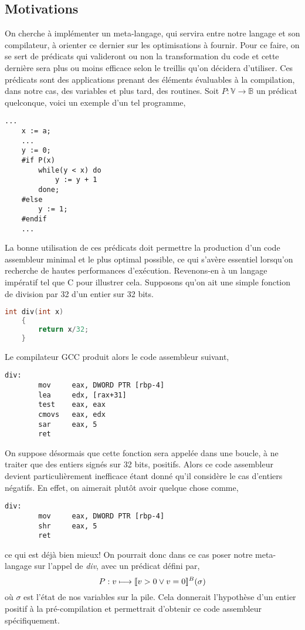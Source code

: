 \documentclass[a4paper, 10pt]{article}
\begin{document}
\subsection{Motivations}
On cherche à implémenter un meta-langage, qui servira entre notre langage et son compilateur, à orienter
ce dernier sur les optimisations à fournir. Pour ce faire, on se sert de prédicats qui valideront ou non la
transformation du code et cette dernière sera plus ou moins efficace selon le treillis qu'on décidera d'utiliser. 
Ces prédicats sont des applications prenant des éléments évaluables à la compilation, 
dans notre cas, des variables et plus tard, des routines.
Soit $P : \mathbb{V} \longrightarrow \mathbb{B}$ un prédicat quelconque, voici un exemple d'un tel programme,
\begin{lstlisting}[tabsize=2]
	...
	x := a;
	...
	y := 0;
	#if P(x)
		while(y < x) do
			y := y + 1
		done;
	#else
		y := 1;
	#endif
	...
\end{lstlisting}
La bonne utilisation de ces prédicats doit permettre la production d'un code assembleur minimal et le plus
optimal possible, ce qui s'avère essentiel lorsqu'on recherche de hautes performances d'exécution.
Revenons-en à un langage impératif tel que C pour illustrer cela. Supposons qu'on ait une simple fonction de division 
par 32 d'un entier sur 32 bits.
\begin{lstlisting}[tabsize=2, language=c]
	int div(int x)
	{
		return x/32;
	}
\end{lstlisting}
Le compilateur GCC produit alors le code assembleur suivant,
\begin{lstlisting}[tabsize=2]
	div:
		mov     eax, DWORD PTR [rbp-4]
		lea     edx, [rax+31]
		test    eax, eax
		cmovs   eax, edx
		sar     eax, 5
		ret
\end{lstlisting}
On suppose désormais que cette fonction sera appelée dans une boucle, à ne traiter que des entiers signés sur 32 bits, positifs.
Alors ce code assembleur devient particulièrement inefficace étant donné qu'il considère le cas d'entiers
négatifs. En effet, on aimerait plutôt avoir quelque chose comme,
\begin{lstlisting}[tabsize=2]
	div:
		mov     eax, DWORD PTR [rbp-4]
		shr     eax, 5
		ret
\end{lstlisting}
ce qui est déjà bien mieux! On pourrait donc dans ce cas poser notre meta-langage sur l'appel de \textit{div}, avec un prédicat
défini par,
\[P : v \longmapsto [\![{v > 0 \vee v = 0}]\!]^{B}(\sigma)\]
où $\sigma$ est l'état de nos variables sur la pile. Cela donnerait l'hypothèse d'un entier positif à la pré-compilation
et permettrait d'obtenir ce code assembleur spécifiquement.
\end{document}
